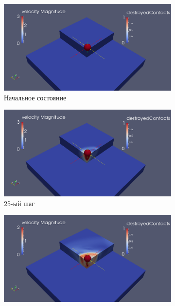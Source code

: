 \begin{figure}[H]
\begin{subfigure}[b]{0.5\textwidth}
\centering
\includegraphics[width=1.0\textwidth]{png/delamination/double_clip/0.png}
\caption{Начальное состояние}
\end{subfigure}
\begin{subfigure}[b]{0.5\textwidth}
\centering
\includegraphics[width=1.0\textwidth]{png/delamination/double_clip/25.png}
\caption{25-ый шаг}
\end{subfigure}
\begin{subfigure}[b]{0.5\textwidth}
\centering
\includegraphics[width=1.0\textwidth]{png/delamination/double_clip/80.png}

\end{subfigure}
\end{figure}
